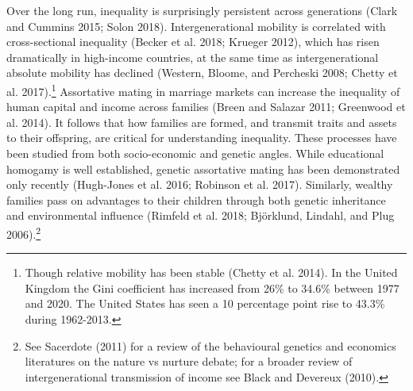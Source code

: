 \documentclass[
]{article}
\theoremstyle{definition}
\theoremstyle{definition}
\theoremstyle{definition}
\theoremstyle{definition}
\theoremstyle{remark}
\begin{document}
Over the long run, inequality is surprisingly persistent across generations
(Clark and Cummins 2015; Solon 2018). Intergenerational mobility is
correlated with cross-sectional inequality (Becker et al. 2018; Krueger 2012),
which has risen dramatically in high-income countries, at the
same time as intergenerational absolute mobility has declined
(Western, Bloome, and Percheski 2008; Chetty et al. 2017).\footnote{Though relative mobility has been stable (Chetty et al. 2014). In the
  United Kingdom the Gini coefficient has increased from 26\% to 34.6\% between 1977
  and 2020. The United States has seen a 10 percentage point rise to 43.3\%
  during 1962-2013.} Assortative mating in
marriage markets can increase the inequality of human capital and income
across families (Breen and Salazar 2011; Greenwood et al. 2014). It follows that
how families are formed, and transmit traits and assets to their offspring,
are critical for understanding inequality. These processes have been studied
from both socio-economic and genetic angles. While educational homogamy is
well established, genetic assortative mating has been demonstrated only recently
(Hugh-Jones et al. 2016; Robinson et al. 2017). Similarly, wealthy families pass on
advantages to their children through both genetic inheritance and environmental
influence (Rimfeld et al. 2018; Björklund, Lindahl, and Plug 2006).\footnote{See Sacerdote (2011) for a review of the behavioural genetics and
  economics literatures on the nature vs nurture debate; for a broader review of
  intergenerational transmission of income see Black and Devereux (2010).}
\end{document}
